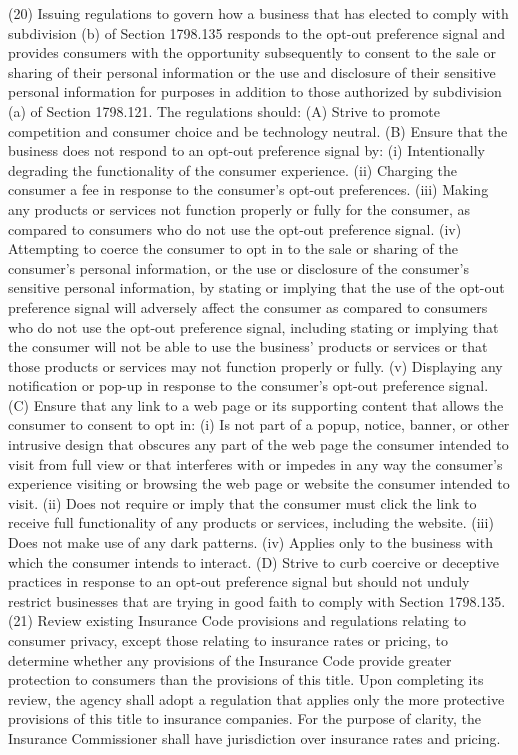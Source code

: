 (20) Issuing regulations to govern how a business that has elected to comply with subdivision (b) of Section 1798.135 responds to the opt-out preference signal and provides consumers with the opportunity subsequently to consent to the sale or sharing of their personal information or the use and disclosure of their sensitive personal information for purposes in addition to those authorized by subdivision (a) of Section 1798.121. The regulations should:
(A) Strive to promote competition and consumer choice and be technology neutral.
(B) Ensure that the business does not respond to an opt-out preference signal by:
(i) Intentionally degrading the functionality of the consumer experience.
(ii) Charging the consumer a fee in response to the consumer’s opt-out preferences.
(iii) Making any products or services not function properly or fully for the consumer, as compared to consumers who do not use the opt-out preference signal.
(iv) Attempting to coerce the consumer to opt in to the sale or sharing of the consumer’s personal information, or the use or disclosure of the consumer’s sensitive personal information, by stating or implying that the use of the opt-out preference signal will adversely affect the consumer as compared to consumers who do not use the opt-out preference signal, including stating or implying that the consumer will not be able to use the business’ products or services or that those products or services may not function properly or fully.
(v) Displaying any notification or pop-up in response to the consumer’s opt-out preference signal.
(C) Ensure that any link to a web page or its supporting content that allows the consumer to consent to opt in:
(i) Is not part of a popup, notice, banner, or other intrusive design that obscures any part of the web page the consumer intended to visit from full view or that interferes with or impedes in any way the consumer’s experience visiting or browsing the web page or website the consumer intended to visit.
(ii) Does not require or imply that the consumer must click the link to receive full functionality of any products or services, including the website.
(iii) Does not make use of any dark patterns.
(iv) Applies only to the business with which the consumer intends to interact.
(D) Strive to curb coercive or deceptive practices in response to an opt-out preference signal but should not unduly restrict businesses that are trying in good faith to comply with Section 1798.135.
(21) Review existing Insurance Code provisions and regulations relating to consumer privacy, except those relating to insurance rates or pricing, to determine whether any provisions of the Insurance Code provide greater protection to consumers than the provisions of this title. Upon completing its review, the agency shall adopt a regulation that applies only the more protective provisions of this title to insurance companies. For the purpose of clarity, the Insurance Commissioner shall have jurisdiction over insurance rates and pricing.
